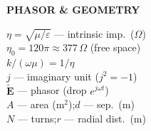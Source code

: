 \documentclass[6pt,letterpaper]{article}
\newcommand{\shead}[3]{%
  \noindent\colorbox{#1}{\parbox{\dimexpr\linewidth-2\fboxsep\relax}%
  {\color{#2}\bfseries\fontsize{6}{7}\selectfont #3}}\vspace{0.5pt}}
\begin{document}
\begin{minipage}[t]{0.19\linewidth}
\shead{pinkbg}{pink}{PHASOR \& GEOMETRY}
\begin{ebox}
$\eta=\sqrt{\mu/\varepsilon}$ — intrinsic imp.\ ($\Omega$)\\
$\eta_0=120\pi\approx377\,\Omega$ (free space)\\
$k/(\omega\mu)=1/\eta$\\
$j$ — imaginary unit ($j^2=-1$)\\
$\tilde{\mathbf{E}}$ — phasor (drop $e^{j\omega t}$)\\[2pt]
$A$ — area (m$^2$);\quad $d$ — sep.\ (m)\\
$N$ — turns;\quad $r$ — radial dist.\ (m)
\end{ebox}
\end{minipage}
\end{document}
